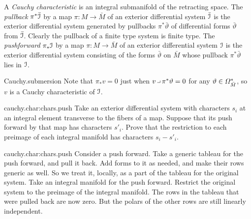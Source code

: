 A \emph{Cauchy characteristic} is an integral submanifold of the retracting space.
The \emph{pullback} \(\pi^*\bar{\mathcal{I}}\) by a map \(\pi \colon M \to \bar{M}\) of an exterior differential system \(\bar{\mathcal{I}}\) is the exterior differential system generated by pullbacks \(\pi^*\bar\vartheta\) of differential forms \(\bar\vartheta\) from \(\bar{\mathcal{I}}\).
Clearly the pullback of a finite type system is finite type.
The \emph{pushforward} \(\pi_*\mathcal{I}\) by a map \(\pi \colon M \to \bar{M}\) of an exterior differential system \(\mathcal{I}\) is the exterior differential system consisting of the forms \(\bar\vartheta\) on \(\bar{M}\) whose pullback \(\pi^*\bar\vartheta\) lies in \(\mathcal{I}\).
%
\begin{answer}{Cauchy.submersion}%
Note that \(\pi_* v=0\) just when \(v \hook \pi^*\vartheta=0\) for any \(\vartheta\in \Omega^{*}_{\bar{M}}\), so  \(v\) is a Cauchy characteristic of \(\mathcal{I}\).%
\end{answer}
\begin{problem}{cauchy.char:chars.push}
Take an exterior differential system with characters \(s_i\) at an integral element transverse to the fibers of a map.
Suppose that  its push forward by that map has characters \(s'_i\).
Prove that the restriction to each preimage of each integral manifold has characters \(s_i-s'_i\).
\end{problem}
\begin{answer}{cauchy.char:chars.push}
Consider a push forward.
Take a generic tableau for the push forward, and pull it back.
Add forms to it as needed, and make their rows generic as well.
So we treat it, locally, as a part of the tableau for the original system.
Take an integral manifold for the push forward.
Restrict the original system to the preimage of the integral manifold. 
The rows in the tableau that were pulled back are now zero.
But the polars of the other rows are still linearly independent.
\end{answer}
